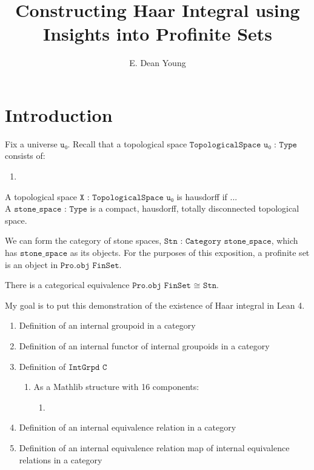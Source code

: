 \documentclass[13pt]{amsart}
\title{Constructing Haar Integral using Insights into Profinite Sets}
\author{E. Dean Young}
\begin{document}
\section{Introduction}

Fix a universe $\texttt{u₀}$. Recall that a topological space $\texttt{TopologicalSpace u₀ : Type}$ consists of:

\begin{enumerate}
\item 
\end{enumerate}

A topological space $\texttt{X : TopologicalSpace u₀}$ is hausdorff if ...\\




A $\texttt{stone\_space : Type}$ is a compact, hausdorff, totally disconnected topological space. 

We can form the category of stone spaces, $\texttt{Stn : Category stone\_space}$, which has $\texttt{stone\_space}$ as its objects. For the purposes of this exposition, a profinite set is an object in $\texttt{Pro.obj FinSet}$. 

There is a categorical equivalence $\texttt{Pro.obj FinSet ≅ Stn}$.

My goal is to put this demonstration of the existence of Haar integral in Lean 4.\\



\begin{enumerate}
\item Definition of an internal groupoid in a category
\item Definition of an internal functor of internal groupoids in a category
\item Definition of $\texttt{IntGrpd C}$
\begin{enumerate}
\item As a Mathlib structure with 16 components:
\begin{enumerate}
\item 
\end{enumerate}
\end{enumerate}
\item Definition of an internal equivalence relation in a category
\item Definition of an internal equivalence relation map of internal equivalence relations in a category
\end{enumerate}
\end{document}
